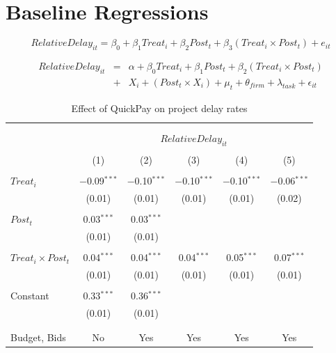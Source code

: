 \documentclass[]{article}
\begin{document}
\hypertarget{baseline-regressions}{%
\section{Baseline Regressions}\label{baseline-regressions}}

\[ RelativeDelay_{it} = \beta_0 + \beta_1 Treat_i + \beta_2 Post_t + \beta_3 (Treat_i \times Post_t) + e_{it}\]

\[ \begin{aligned} RelativeDelay_{it} &=& \alpha+\beta_0 Treat_i + \beta_1 Post_t + \beta_2 (Treat_i \times Post_t)\\
&+&  X_i + (Post_t \times X_i) + \mu_t + \theta_{firm} + \lambda_{task}+ \epsilon_{it}
\end{aligned}\]

\begin{table}[H] \centering 
  \caption{Effect of QuickPay on project delay rates} 
  \label{} 
\small 
\begin{tabular}{@{\extracolsep{-2pt}}lccccc} 
\\[-1.8ex]\hline 
\hline \\[-1.8ex] 
\\[-1.8ex] & \multicolumn{5}{c}{$RelativeDelay_{it}$} \\ 
\\[-1.8ex] & (1) & (2) & (3) & (4) & (5)\\ 
\hline \\[-1.8ex] 
 $Treat_i$ & $-$0.09$^{***}$ & $-$0.10$^{***}$ & $-$0.10$^{***}$ & $-$0.10$^{***}$ & $-$0.06$^{***}$ \\ 
  & (0.01) & (0.01) & (0.01) & (0.01) & (0.02) \\ 
  & & & & & \\ 
 $Post_t$ & 0.03$^{***}$ & 0.03$^{***}$ &  &  &  \\ 
  & (0.01) & (0.01) &  &  &  \\ 
  & & & & & \\ 
 $Treat_i \times Post_t$ & 0.04$^{***}$ & 0.04$^{***}$ & 0.04$^{***}$ & 0.05$^{***}$ & 0.07$^{***}$ \\ 
  & (0.01) & (0.01) & (0.01) & (0.01) & (0.01) \\ 
  & & & & & \\ 
 Constant & 0.33$^{***}$ & 0.36$^{***}$ &  &  &  \\ 
  & (0.01) & (0.01) &  &  &  \\ 
  & & & & & \\ 
\hline \\[-1.8ex] 
Budget, Bids & No & Yes & Yes & Yes & Yes \\ 

\end{tabular}
\end{table}
\end{document}
